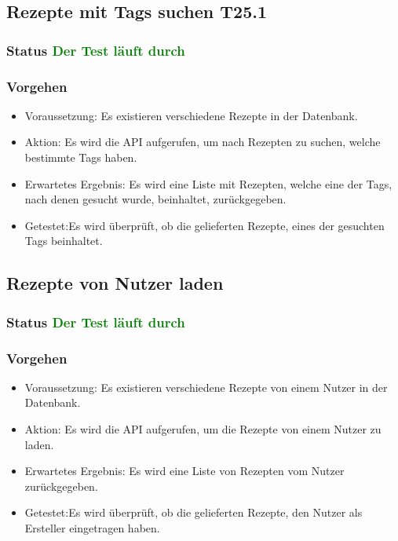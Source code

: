 \subsection{Rezepte mit Tags suchen T25.1}
\subsubsection{Status \textcolor{green}{ Der Test läuft durch} }
\subsubsection{Vorgehen}
\begin{itemize}
	\item Voraussetzung: Es existieren verschiedene Rezepte in der Datenbank.
	\item Aktion: Es wird die API aufgerufen, um nach Rezepten zu suchen, welche bestimmte Tags haben.
	\item Erwartetes Ergebnis: Es wird eine Liste mit Rezepten, welche eine der Tags, nach denen gesucht wurde, beinhaltet, zurückgegeben.
	\item Getestet:Es wird überprüft, ob die gelieferten Rezepte, eines der gesuchten Tags beinhaltet.
\end{itemize}

\subsection{Rezepte von Nutzer laden}
\subsubsection{Status \textcolor{green}{ Der Test läuft durch} }
\subsubsection{Vorgehen}
\begin{itemize}
	\item Voraussetzung: Es existieren verschiedene Rezepte von einem Nutzer in der Datenbank.
	\item Aktion: Es wird die API aufgerufen, um die Rezepte von einem Nutzer zu laden.
	\item Erwartetes Ergebnis: Es wird eine Liste von Rezepten vom Nutzer zurückgegeben.
	\item Getestet:Es wird überprüft, ob die gelieferten Rezepte, den Nutzer als Ersteller eingetragen haben.
\end{itemize}



